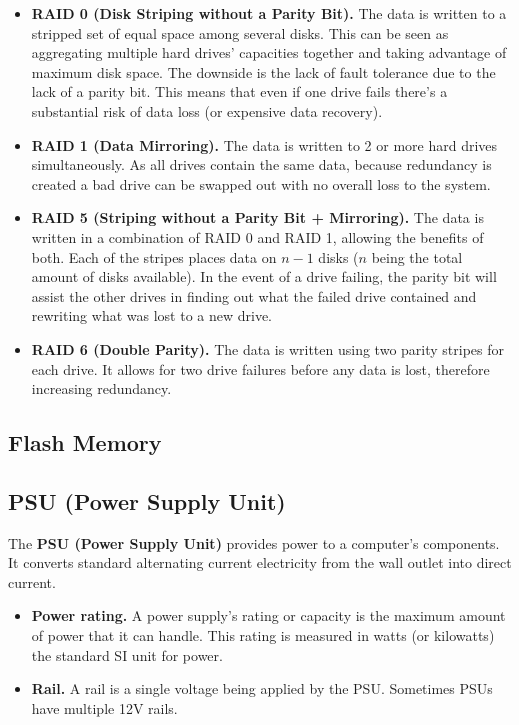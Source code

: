 \documentclass{article}
\begin{document}
\begin{itemize}

\item \textbf{RAID 0 (Disk Striping without a Parity Bit).} The data is written to a stripped set of equal space among several disks. This can be seen as aggregating multiple hard drives' capacities together and taking advantage of maximum disk space. The downside is the lack of fault tolerance due to the lack of a parity bit. This means that even if one drive fails there's a substantial risk of data loss (or expensive data recovery).
\item \textbf{RAID 1 (Data Mirroring).} The data is written to 2 or more hard drives simultaneously. As all drives contain the same data, because redundancy is created a bad drive can be swapped out with no overall loss to the system.
\item \textbf{RAID 5 (Striping without a Parity Bit + Mirroring).} The data is written in a combination of RAID 0 and RAID 1, allowing the benefits of both. Each of the stripes places data on $n-1$ disks ($n$ being the total amount of disks available). In the event of a drive failing, the parity bit will assist the other drives in finding out what the failed drive contained and rewriting what was lost to a new drive.
\item \textbf{RAID 6 (Double Parity).} The data is written using two parity stripes for each drive. It allows for two drive failures before any data is lost, therefore increasing redundancy.
\end{itemize}

\subsection{Flash Memory}

\subsection{PSU (Power Supply Unit)}

The \textbf{PSU (Power Supply Unit)} provides power to a computer's components. It converts standard alternating current electricity from the wall outlet into direct current.

\begin{itemize}
\item \textbf{Power rating.} A power supply's rating or capacity is the maximum amount of power that it can handle. This rating is measured in watts (or kilowatts) the standard SI unit for power.
\item \textbf{Rail.} A rail is a single voltage being applied by the PSU. Sometimes PSUs have multiple 12V rails.
\end{itemize}
\end{document}
